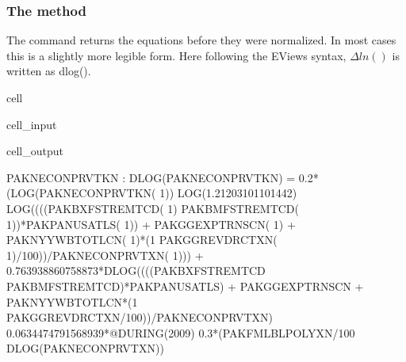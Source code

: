 \documentclass[letterpaper,10pt,english]{jupyterBook}
\begin{document}
\subsubsection{The  method}
\label{\detokenize{content/05_WBModels/LoadingWBModel:the-eviews-method}}
\sphinxAtStartPar
The  command returns the equations before they were normalized. In most cases this is a slightly more legible form. Here following the EViews syntax, \(\Delta ln()\) is written as dlog().

\begin{sphinxuseclass}{cell}\begin{sphinxVerbatimInput}

\begin{sphinxuseclass}{cell_input}
\begin{sphinxVerbatim}[commandchars=\\\{\}]
\PYG{p}{[}\PYG{p}{]}
\end{sphinxVerbatim}

\end{sphinxuseclass}\end{sphinxVerbatimInput}
\begin{sphinxVerbatimOutput}

\begin{sphinxuseclass}{cell_output}
\begin{sphinxVerbatim}[commandchars=\\\{\}]
PAKNECONPRVTKN : DLOG(PAKNECONPRVTKN) =\PYGZhy{} 0.2*(LOG(PAKNECONPRVTKN( \PYGZhy{} 1)) \PYGZhy{} LOG(1.21203101101442) \PYGZhy{} LOG((((PAKBXFSTREMTCD( \PYGZhy{} 1) \PYGZhy{} PAKBMFSTREMTCD( \PYGZhy{} 1))*PAKPANUSATLS( \PYGZhy{} 1)) + PAKGGEXPTRNSCN( \PYGZhy{} 1) + PAKNYYWBTOTLCN( \PYGZhy{} 1)*(1 \PYGZhy{} PAKGGREVDRCTXN( \PYGZhy{} 1)/100))/PAKNECONPRVTXN( \PYGZhy{} 1))) + 0.763938860758873*DLOG((((PAKBXFSTREMTCD \PYGZhy{} PAKBMFSTREMTCD)*PAKPANUSATLS) + PAKGGEXPTRNSCN + PAKNYYWBTOTLCN*(1 \PYGZhy{} PAKGGREVDRCTXN/100))/PAKNECONPRVTXN) \PYGZhy{} 0.0634474791568939*@DURING(\PYGZdq{}2009\PYGZdq{}) \PYGZhy{} 0.3*(PAKFMLBLPOLYXN/100 \PYGZhy{} DLOG(PAKNECONPRVTXN))
\end{sphinxVerbatim}

\end{sphinxuseclass}\end{sphinxVerbatimOutput}

\end{sphinxuseclass}
\end{document}
